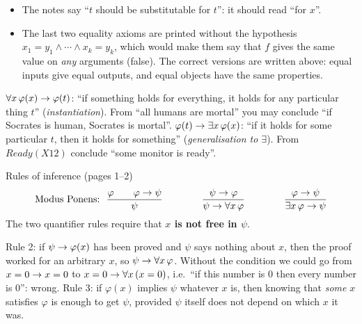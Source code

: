 \begin{nbwarning}
\begin{itemize}[nosep]
  \item The notes say ``$t$ should be substitutable for $t$'': it should read ``for $x$''.
  \item The last two equality axioms are printed without the hypothesis
        $x_1 = y_1 \land \cdots \land x_k = y_k$, which would make them say that $f$ gives
        the same value on \emph{any} arguments (false). The correct versions are written
        above: equal inputs give equal outputs, and equal objects have the same properties.
\end{itemize}
\end{nbwarning}

\begin{nbintuition}
$\forall x\,\varphi(x) \rightarrow \varphi(t)$: ``if something holds for everything, it holds for
any particular thing $t$'' (\emph{instantiation}). From ``all humans are mortal'' you may
conclude ``if Socrates is human, Socrates is mortal''.
$\varphi(t) \rightarrow \exists x\,\varphi(x)$: ``if it holds for some particular $t$, then it
holds for something'' (\emph{generalisation to $\exists$}). From
$\mathit{Ready}(X12)$ conclude ``some monitor is ready''.
\end{nbintuition}

\begin{nbfact}{Rules of inference (pages 1--2)}
\[
\text{Modus Ponens:}\ \ \frac{\varphi \qquad \varphi \rightarrow \psi}{\psi}
\qquad\qquad
\frac{\psi \rightarrow \varphi}{\psi \rightarrow \forall x\,\varphi}
\qquad\qquad
\frac{\varphi \rightarrow \psi}{\exists x\,\varphi \rightarrow \psi}
\]
The two quantifier rules require that \textbf{$x$ is not free in $\psi$}.
\end{nbfact}

\begin{nbintuition}
Rule 2: if $\psi \rightarrow \varphi(x)$ has been proved and $\psi$ says nothing about $x$, then
the proof worked for an arbitrary $x$, so $\psi \rightarrow \forall x\,\varphi$. Without the
condition we could go from $x = 0 \rightarrow x = 0$ to $x = 0 \rightarrow \forall x\,(x = 0)$, i.e.\
``if this number is 0 then every number is 0'': wrong. Rule 3: if $\varphi(x)$ implies
$\psi$ whatever $x$ is, then knowing that \emph{some} $x$ satisfies $\varphi$ is enough
to get $\psi$, provided $\psi$ itself does not depend on which $x$ it was.
\end{nbintuition}

